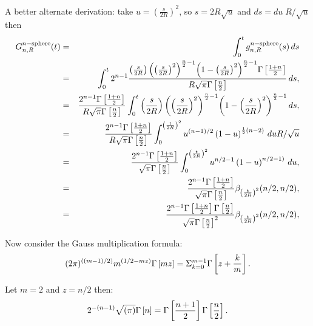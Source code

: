     
A better alternate derivation: take $u={\left(\frac{s}{2R}\right)}^2$, so $s = 2R \sqrt{u}$ and $ds = du\; R / \sqrt{u}$ then
\begin{eqnarray}
G^{n-{\rm sphere}}_{n,R}(t)
    & = & \int_0^t g^{n-{\rm sphere}}_{n,R}(s) \, ds \nonumber \\
    & = & \int_0^t  2^{n-1} \frac{\left( \frac{s}{2R}\right) {\left({\left( \frac{s}{2R}\right)}^{2}\right)}^{\frac{n}{2} -1}
             {\left(1 - {\left( \frac{s}{2R}\right)}^{2}  \right)}^{\frac{n}{2} -1}
             \Gamma\left[\frac{1+n}{2}\right]}{R\sqrt{\pi }
             \Gamma\left[\frac{n}{2}\right]} 
             \, ds, \nonumber \\    
    & = & \frac{ 2^{n- 1} \Gamma\left[\frac{1+n}{2}\right]}{R\sqrt{\pi}\Gamma\left[\frac{n}{2}\right]}
           \int_0^t \left( \frac{s}{2R}\right) {\left({\left( \frac{s}{2R}\right)}^{2}\right)}^{\frac{n}{2} -1}
             {\left(1 - {\left( \frac{s}{2R}\right)}^{2}  \right)}^{\frac{n}{2} -1}
             \, ds, \nonumber \\    
    & = & \frac{ 2^{n-1} \Gamma\left[\frac{1+n}{2}\right]}{R\sqrt{\pi}\Gamma\left[\frac{n}{2}\right]}
           \int_0^{ {\left(\frac{t}{2R}\right)}^{2} } u^{(n-1)/2}  \left(1 - u\right)^{\frac{1}{2} (n-2)}
             \, du R / \sqrt{u}  \nonumber \\    
    & = & \frac{ 2^{n-1} \Gamma\left[\frac{1+n}{2}\right]}{\sqrt{\pi}\Gamma\left[\frac{n}{2}\right]}
           \int_0^{{\left(\frac{t}{2R}\right)}^{2}} u^{n/2-1}  \left(1 - u\right)^{n/2-1)}
             \, du,  \nonumber \\    
    & = & \frac{ 2^{n-1} \Gamma\left[\frac{1+n}{2}\right]}{\sqrt{\pi}\Gamma\left[\frac{n}{2}\right]}
               \beta_{{\left(\frac{t}{2R}\right)}^{2}}(n/2, n/2),  \nonumber \\    
    & = & \frac{ 2^{n-1} \Gamma\left[\frac{1+n}{2}\right] \Gamma\left[\frac{n}{2}\right] }{\sqrt{\pi}\Gamma\left[\frac{n}{2}\right]^2}
               \beta_{{\left(\frac{t}{2R}\right)}^{2}}(n/2, n/2),  \nonumber \\ 
\end{eqnarray}


Now consider the Gauss multiplication formula: 
\begin{equation}
(2\pi)^{((m-1)/2)}m^{(1/2-mz)} \Gamma\left[mz\right]=\Sigma_{k=0}^{m-1}\Gamma\left[z+\frac{k}{m}\right].  \nonumber \\ 
\end{equation}

Let $m = 2$ and $z = n/2$ then:
\begin{equation}
 2^{-(n-1)}\sqrt{(\pi)} \Gamma\left[n\right]=\Gamma\left[\frac{n+1}{2}\right] \Gamma\left[\frac{n}{2}\right].   \nonumber \\ 
\end{equation}


